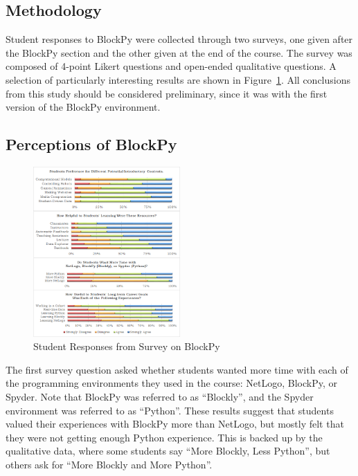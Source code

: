 \documentclass[10pt, conference, compsocconf]{IEEEtran}
\begin{document}
\subsection{Methodology}

Student responses to BlockPy were collected through two surveys, one given after the BlockPy section and the other given at the end of the course.
The survey was composed of 4-point Likert questions and open-ended qualitative questions.
A selection of particularly interesting results are shown in Figure~\ref{fig-survey-results}.
All conclusions from this study should be considered preliminary, since it was with the first version of the BlockPy environment.

\subsection{Perceptions of BlockPy}

\begin{figure}
\includegraphics[width=0.5\textwidth]{images/survey-results-smaller}
\caption{Student Responses from Survey on BlockPy}
\label{fig-survey-results}
\end{figure}


The first survey question asked whether students wanted more time with each of the programming environments they used in the course: NetLogo, BlockPy, or Spyder.
Note that BlockPy was referred to as ``Blockly'', and the Spyder environment was referred to as ``Python''.
These results suggest that students valued their experiences with BlockPy more than NetLogo, but mostly felt that they were not getting enough Python experience. 
This is backed up by the qualitative data, where some students say ``More Blockly, Less Python'', but others ask for ``More Blockly and More Python''.
\end{document}
